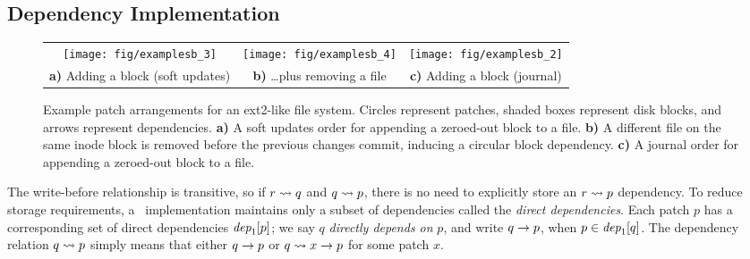 \subsection{Dependency Implementation}



\begin{figure*}[t]
\centering
\begin{tabular}{@{}cc@{\qquad\qquad}c@{}}
\texttt{[image: fig/examplesb\_3]}
& \texttt{[image: fig/examplesb\_4]}
& \texttt{[image: fig/examplesb\_2]} \\
\textbf{a)} Adding a block (soft updates)
& \textbf{b)} \dots plus removing a file
& \textbf{c)} Adding a block (journal) \\
\end{tabular}
\caption{Example patch arrangements for an ext2-like file system.
 Circles represent patches, shaded boxes represent disk blocks, and arrows
 represent dependencies.
 \textbf{a)} A soft updates order for appending a zeroed-out block to
 a file.  \textbf{b)} A different file on the same inode block is removed
 before the previous changes commit, inducing a circular block dependency.
 \textbf{c)} A journal order for appending a zeroed-out block to a
 file.}
\label{f:ex}
\end{figure*}


The write-before relationship is transitive, so if $r \leadsto q$ and $q
 \leadsto p$, there is no need to explicitly store an $r \leadsto p$
 dependency.
%
To reduce storage requirements, a \Kudos\ implementation maintains only a
 subset of dependencies called the \emph{direct dependencies}.
%
Each patch $p$ has a corresponding set of direct dependencies
 $\textit{dep}_1[p]$; 
%
we say $q$ \emph{directly depends on} $p$, and write $q \rightarrow p$, when
 $p \in \textit{dep}_1[q]$.
%
The dependency relation $q \leadsto p$ simply means that either $q
 \rightarrow p$ or $q \leadsto x \rightarrow p$ for some patch $x$.


\begin{comment}
\paragraph{Undo data}
%
When a \patch\ is created, the buffer cache's copy of the block data
is modified in-place to reflect the change. However,
%
some arrangements of \patches\ may require that the buffer cache
first write a block with only some \patches\ applied, and then write a
different block before being able to write the remaining \patches.
%
(An example of this is given in Section~\ref{sec:patch:examples}.)
\end{comment}




